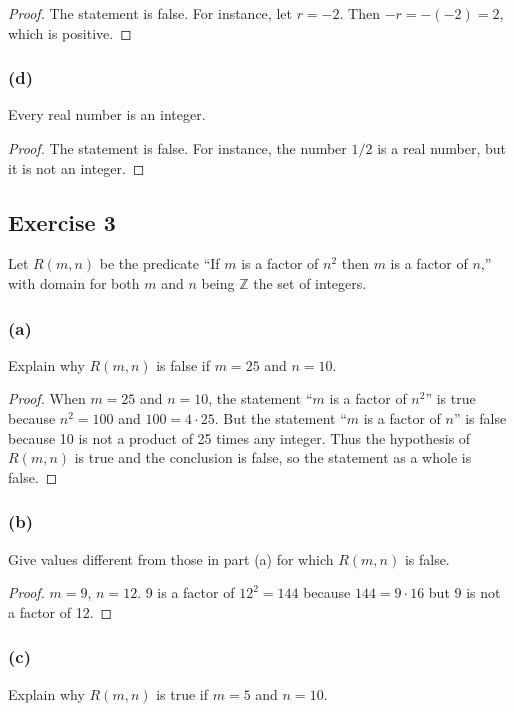 \documentclass[14pt]{extarticle}
\newcommand{\Z}{\mathbb{Z}}
\begin{document}
\begin{proof}
    The statement is false. For instance, let $r = -2$. Then $-r = -(-2) = 2$, which is positive.
\end{proof}

\subsubsection{(d)}
Every real number is an integer.

\begin{proof}
    The statement is false. For instance, the number $1/2$ is a real number, but it is not an integer.
\end{proof}

\subsection{Exercise 3}
Let $R(m, n)$ be the predicate “If $m$ is a factor of $n^2$ then $m$ is a factor of $n$,” with domain for both $m$ and $n$ being $\Z$ the set of integers.

\subsubsection{(a)}
Explain why $R(m, n)$ is false if $m = 25$ and $n = 10$.

\begin{proof}
    When $m = 25$ and $n = 10$, the statement “$m$ is a factor of $n^2$” is true because $n^2 = 100$ and $100 = 4 \cdot 25$. But the statement “$m$ is a factor of $n$” is false because 10 is not a product of 25 times any integer. Thus the hypothesis of $R(m, n)$ is true and the conclusion is false, so the statement as a whole is false.
\end{proof}

\subsubsection{(b)}
Give values different from those in part (a) for which $R(m, n)$ is false.

\begin{proof}
    $m = 9$, $n = 12$. 9 is a factor of $12^2 = 144$ because $144 = 9 \cdot 16$ but 9 is not a factor of 12.
\end{proof}

\subsubsection{(c)}
Explain why $R(m, n)$ is true if $m = 5$ and $n = 10$.
\end{document}
